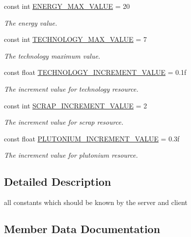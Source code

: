 \begin{DoxyCompactItemize}
const int \hyperlink{classCore_1_1Models_1_1Constants_a73dd9150d21d41b1e61af6c163d8cb6c}{E\+N\+E\+R\+G\+Y\+\_\+\+M\+A\+X\+\_\+\+V\+A\+L\+U\+E} = 20
\begin{DoxyCompactList}\small\item\em The energy value. \end{DoxyCompactList}\item 
const int \hyperlink{classCore_1_1Models_1_1Constants_a1ab07bbbce0393349cffa44d47d306cd}{T\+E\+C\+H\+N\+O\+L\+O\+G\+Y\+\_\+\+M\+A\+X\+\_\+\+V\+A\+L\+U\+E} = 7
\begin{DoxyCompactList}\small\item\em The technology maximum value. \end{DoxyCompactList}\item 
const float \hyperlink{classCore_1_1Models_1_1Constants_a2a4a1624387cb4495c03b99ef7e3086a}{T\+E\+C\+H\+N\+O\+L\+O\+G\+Y\+\_\+\+I\+N\+C\+R\+E\+M\+E\+N\+T\+\_\+\+V\+A\+L\+U\+E} = 0.\+1f
\begin{DoxyCompactList}\small\item\em The increment value for technology resource. \end{DoxyCompactList}\item 
const int \hyperlink{classCore_1_1Models_1_1Constants_a455082f6f12f13a8c7d4f742f9a7a7b0}{S\+C\+R\+A\+P\+\_\+\+I\+N\+C\+R\+E\+M\+E\+N\+T\+\_\+\+V\+A\+L\+U\+E} = 2
\begin{DoxyCompactList}\small\item\em The increment value for scrap resource. \end{DoxyCompactList}\item 
const float \hyperlink{classCore_1_1Models_1_1Constants_ad71a4c6614e19c0ae08b56caa5241750}{P\+L\+U\+T\+O\+N\+I\+U\+M\+\_\+\+I\+N\+C\+R\+E\+M\+E\+N\+T\+\_\+\+V\+A\+L\+U\+E} = 0.\+3f
\begin{DoxyCompactList}\small\item\em The increment value for plutonium resource. \end{DoxyCompactList}\end{DoxyCompactItemize}


\subsection{Detailed Description}
all constants which should be known by the server and client 



\subsection{Member Data Documentation}
\hypertarget{classCore_1_1Models_1_1Constants_adde91f87a25a57db171667f80b72d69f}{}
